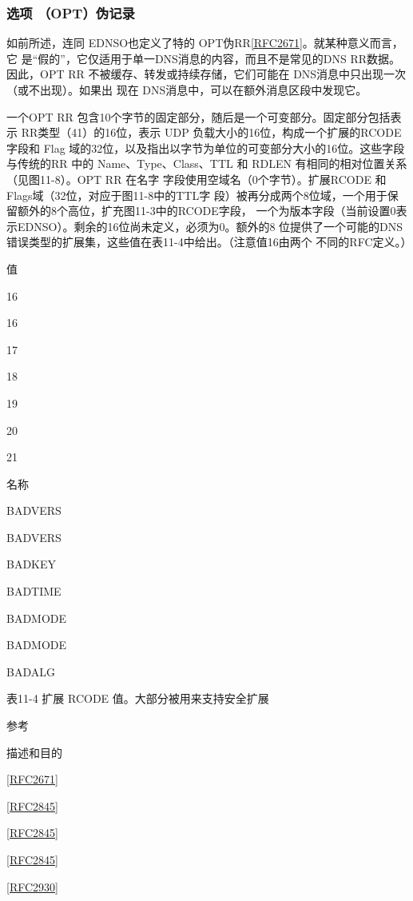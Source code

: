 \subsubsection{选项 （OPT）伪记录}

如前所述，连同 EDNSO也定义了特的 OPT伪RR\href{https://www.rfc-editor.org/rfc/rfc2671}{[RFC2671]}。就某种意义而言，它
是“假的”，它仅适用于单一DNS消息的内容，而且不是常见的DNS RR数据。因此，OPT
RR 不被缓存、转发或持续存储，它们可能在 DNS消息中只出现一次（或不出现）。如果出
现在 DNS消息中，可以在额外消息区段中发现它。

一个OPT RR 包含10个字节的固定部分，随后是一个可变部分。固定部分包括表示
RR类型（41）的16位，表示 UDP 负载大小的16位，构成一个扩展的RCODE 字段和 Flag
域的32位，以及指出以字节为单位的可变部分大小的16位。这些字段与传统的RR 中的
Name、Type、Class、TTL 和 RDLEN 有相同的相对位置关系（见图11-8）。OPT RR 在名字
字段使用空域名（0个字节）。扩展RCODE 和Flags域（32位，对应于图11-8中的TTL字
段）被再分成两个8位域，一个用于保留额外的8个高位，扩充图11-3中的RCODE字段，
一个为版本字段（当前设置0表示EDNSO）。剩余的16位尚未定义，必须为0。额外的8
位提供了一个可能的DNS错误类型的扩展集，这些值在表11-4中给出。（注意值16由两个
不同的RFC定义。）

值

16

16

17

18

19

20

21

名称

BADVERS

BADVERS

BADKEY

BADTIME

BADMODE

BADMODE

BADALG

表11-4 扩展 RCODE 值。大部分被用来支持安全扩展

参考

描述和目的

\href{https://www.rfc-editor.org/rfc/rfc2671}{[RFC2671]}

\href{https://www.rfc-editor.org/rfc/rfc2845}{[RFC2845]}

\href{https://www.rfc-editor.org/rfc/rfc2845}{[RFC2845]}

\href{https://www.rfc-editor.org/rfc/rfc2845}{[RFC2845]}

\href{https://www.rfc-editor.org/rfc/rfc2930}{[RFC2930]}

